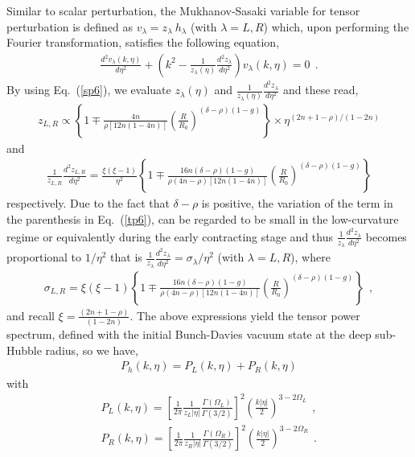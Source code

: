 \documentclass{article}
\begin{document}
Similar to scalar perturbation, the Mukhanov-Sasaki variable for 
tensor perturbation is defined as $v_{\lambda} = z_{\lambda}~h_{\lambda}$ (with $\lambda = L,R$) which, 
upon performing the Fourier transformation, satisfies the following equation,
\begin{align}
\frac{d^2v_{\lambda}(k,\eta)}{d\eta^2}
+ \left(k^2 - \frac{1}{z_{\lambda}(\eta)}\frac{d^2z_{\lambda}}{d\eta^2}\right)v_{\lambda}(k,\eta) = 0~~.
\label{tp4}
\end{align}
By using Eq.~(\ref{sp6}), we evaluate $z_{\lambda}(\eta)$ and $\frac{1}{z_{\lambda}(\eta)}\frac{d^2z_{\lambda}}{d\eta^2}$ and these read,
\begin{align}
z_{L,R} \propto \left\{1 \mp \frac{4n}{\rho\left[12n(1-4n)\right]}\left(\frac{R}{R_0}\right)^{(\delta-\rho)(1-g)}\right\}\times\eta^{(2n+1-\rho)/(1-2n)}
\label{tpnew}
\end{align}
and
\begin{align}
\frac{1}{z_{L,R}}\frac{d^2z_{L,R}}{d\eta^2} = \frac{\xi(\xi-1)}{\eta^2}
\left\{1 \mp \frac{16n(\delta-\rho)(1-g)}{\rho(4n-\rho)\left[12n(1-4n)\right]}\left(\frac{R}{R_0}\right)^{(\delta-\rho)(1-g)}\right\}
\label{tp6}
\end{align}
respectively. Due to the fact that $\delta-\rho$ is positive, the variation of the term in the parenthesis in Eq.~(\ref{tp6}), 
can be regarded to be small in the low-curvature regime or equivalently during the early contracting stage and thus 
$\frac{1}{z_{\lambda}}\frac{d^2z_{\lambda}}{d\eta^2}$ becomes proportional to 
$1/\eta^2$ that is $\frac{1}{z_{\lambda}}\frac{d^2z_{\lambda}}{d\eta^2} = \sigma_{\lambda}/\eta^2$ (with $\lambda = L,R$), where
\begin{align}
\sigma_{L,R} = \xi(\xi-1)
\left\{1 \mp \frac{16n(\delta-\rho)(1-g)}{\rho(4n-\rho)\left[12n(1-4n)\right]}\left(\frac{R}{R_0}\right)^{(\delta-\rho)(1-g)}\right\}~~,
\label{tp9}
\end{align}
and recall $\xi = \frac{(2n+1-\rho)}{(1-2n)}$. The above expressions yield the tensor power spectrum, defined with the initial Bunch-Davies vacuum state 
at the deep sub-Hubble radius, so we have,
\begin{eqnarray}
 P_{h}(k,\eta) = P_{L}(k,\eta) + P_{R}(k,\eta)
 \label{tp10}
\end{eqnarray}
with
\begin{eqnarray}
P_{L}(k,\eta) = \left[\frac{1}{2\pi}\frac{1}{z_L|\eta|}\frac{\Gamma(\Omega_L)}{\Gamma(3/2)}\right]^2 \left(\frac{k|\eta|}{2}\right)^{3 - 2\Omega_L}~~,\nonumber\\
P_{R}(k,\eta) = \left[\frac{1}{2\pi}\frac{1}{z_R|\eta|}\frac{\Gamma(\Omega_R)}{\Gamma(3/2)}\right]^2 \left(\frac{k|\eta|}{2}\right)^{3 - 2\Omega_R}~~.
\label{tp11}
\end{eqnarray}
\end{document}
